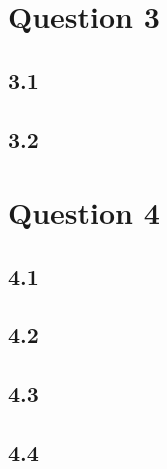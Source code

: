 \documentclass[11pt, letterpaper]{article}
\begin{document}
\section*{Question 3}
\subsection*{3.1}

\subsection*{3.2}


\section*{Question 4}
\subsection*{4.1}

\subsection*{4.2}

\subsection*{4.3}

\subsection*{4.4}
\end{document}
